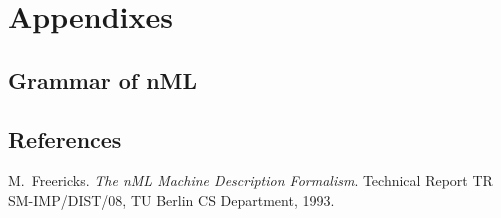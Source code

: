 \documentclass[oneside,final,14pt]{extreport}
\begin{document}




\chapter{Appendixes}

\section{Grammar of nML}

\section{References}



\begin{thebibliography}{1}

M.~Freericks.
\emph{The nML Machine Description Formalism}.
Technical Report TR SM-IMP/DIST/08, TU Berlin CS Department, 1993.

\end{thebibliography}
\end{document}
